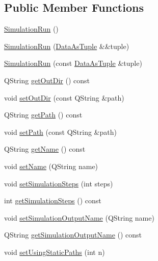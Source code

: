\subsection*{Public Member Functions}
\begin{DoxyCompactItemize}
\item 
\mbox{\hyperlink{class_simulation_run_a47b9805293df9abf6d64ce2919d86e1e}{Simulation\+Run}} ()
\item 
\mbox{\hyperlink{class_simulation_run_a799b66473220219ba8c2a301471213db}{Simulation\+Run}} (\mbox{\hyperlink{class_simulation_run_a0088973963e3846e2543a2b14c686d7b}{Data\+As\+Tuple}} \&\&tuple)
\item 
\mbox{\hyperlink{class_simulation_run_a5accf6275958c73c95c0f628bcbe2217}{Simulation\+Run}} (const \mbox{\hyperlink{class_simulation_run_a0088973963e3846e2543a2b14c686d7b}{Data\+As\+Tuple}} \&tuple)
\item 
Q\+String \mbox{\hyperlink{class_simulation_run_ada1ecfb4099e226453fc5b5ee7e21be5}{get\+Out\+Dir}} () const
\item 
void \mbox{\hyperlink{class_simulation_run_ad1cd6113c8d8b31a05d30d032c99468f}{set\+Out\+Dir}} (const Q\+String \&path)
\item 
Q\+String \mbox{\hyperlink{class_simulation_run_a67edace086ada5e49ad4a74f5a23fbcb}{get\+Path}} () const
\item 
void \mbox{\hyperlink{class_simulation_run_a004ad1cbe1465bca36ef2e8a60120e24}{set\+Path}} (const Q\+String \&path)
\item 
Q\+String \mbox{\hyperlink{class_simulation_run_aa7b0671440d777540383a42e6e551998}{get\+Name}} () const
\item 
void \mbox{\hyperlink{class_simulation_run_a3aab24d4bc5fdb12752b1acf5b23b52d}{set\+Name}} (Q\+String name)
\item 
void \mbox{\hyperlink{class_simulation_run_a197094ac17ad5f298c56ded2ef2157ec}{set\+Simulation\+Steps}} (int steps)
\item 
int \mbox{\hyperlink{class_simulation_run_a5ace491477445d32f2a73092ef5c486f}{get\+Simulation\+Steps}} () const
\item 
void \mbox{\hyperlink{class_simulation_run_a141ddd3ca3dfec857defc2507390b526}{set\+Simulation\+Output\+Name}} (Q\+String name)
\item 
Q\+String \mbox{\hyperlink{class_simulation_run_a7c9b06086254f993ba1498aae5b0dc4f}{get\+Simulation\+Output\+Name}} () const
\item 
void \mbox{\hyperlink{class_simulation_run_aa52987f424a81a67885eb5f95e39ceb0}{set\+Using\+Static\+Paths}} (int n)

\end{DoxyCompactItemize}
